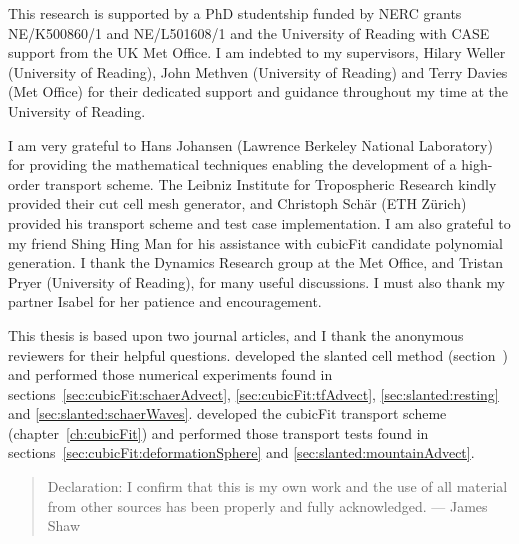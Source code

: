 \null\vfil
\begin{acknowledgements}
This research is supported by a PhD studentship funded by NERC grants NE/K500860/1 and NE/L501608/1 and the University of Reading with CASE support from the UK Met Office.  I am indebted to my supervisors, Hilary Weller (University of Reading), John Methven (University of Reading) and Terry Davies (Met Office) for their dedicated support and guidance throughout my time at the University of Reading.

I am very grateful to Hans Johansen (Lawrence Berkeley National Laboratory) for providing the mathematical techniques enabling the development of a high-order transport scheme.  The Leibniz Institute for Tropospheric Research kindly provided their cut cell mesh generator, and Christoph Sch\"{a}r (ETH Z\"{u}rich) provided his transport scheme and test case implementation.
I am also grateful to my friend Shing Hing Man for his assistance with cubicFit candidate polynomial generation.  I thank the Dynamics Research group at the Met Office, and Tristan Pryer (University of Reading), for many useful discussions.
I must also thank my partner Isabel for her patience and encouragement.
	
This thesis is based upon two journal articles, and I thank the anonymous reviewers for their helpful questions. \citet{shaw-weller2016} developed the slanted cell method (section~\TODO{}) and performed those numerical experiments found in sections~\ref{sec:cubicFit:schaerAdvect}, \ref{sec:cubicFit:tfAdvect}, \ref{sec:slanted:resting} and \ref{sec:slanted:schaerWaves}.
\citet{shaw2017} developed the cubicFit transport scheme (chapter~\ref{ch:cubicFit}) and performed those transport tests found in sections~\ref{sec:cubicFit:deformationSphere} and \ref{sec:slanted:mountainAdvect}.

\vspace*{4em}


\end{acknowledgements}
\vfil
\begin{quote}{\small Declaration: I confirm that this is my own work and the use of all material from other sources has been properly and fully acknowledged. --- James Shaw}
\end{quote}

